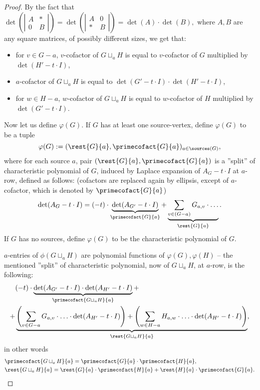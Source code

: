 \begin{proof}
\noindent By the fact that $\det\left(\left|\begin{array}{c|c}
A & \ast\\
\hline
0 & B
\end{array}\right|\right)
=
\det\left(\left|\begin{array}{c|c}
A & 0 \\
\hline
\ast & B
\end{array}\right|\right)
=
\det(A) \cdot \det(B),
$
where $A,B$ are any square matrices, of possibly different sizes,
we get that:
\begin{itemize}
	\item for $v \in G-a$, $v$-cofactor of $G\sqcup_a H$ is equal to $v$-cofactor of $G$ multiplied by $\det(H' - t\cdot I)$, 
	\item $a$-cofactor of $G\sqcup_a H$ is equal to $\det(G' - t\cdot I) \cdot \det(H' - t\cdot I)$,
	\item for $w \in H-a$, $w$-cofactor of $G\sqcup_a H$ is equal to $w$-cofactor of $H$ multiplied by $\det(G' - t\cdot I)$.
\end{itemize}
Now let us define $\varphi(G)$. If $G$ has at least one source-vertex, define $\varphi(G)$ to be a tuple $$\varphi(G):= (\rest{G}{a}, \primecofact{G}{a})_{a \in \sources(G)},$$ where for each source $a$, pair $(\rest{G}{a}, \primecofact{G}{a})$ is a ''split'' of characteristic polynomial of $G$, induced by Laplace expansion of $A_G-t\cdot I$ at $a$-row, defined as follows: (cofactors are replaced again by ellipsis, except of $a$-cofactor, which is denoted by $\primecofact{G}{a}$)
$$
\det(A_G-t\cdot I) = (-t)\cdot \underbrace{\det(A_{G'} - t\cdot I)}_{\primecofact{G}{a}} + \underbrace{\sum_{v \in (G-a)}G_{a,v} \cdot \ldots}_{\rest{G}{a}}.
$$
If $G$ has no sources, define $\varphi(G)$ to be the characteristic polynomial of $G$.

$a$-entries of $\phi(G\sqcup_a H)$ are polynomial functions of $\varphi(G), \varphi(H)$ --
the mentioned ''split'' of characteristic polynomial, now of $G\sqcup_a H$, at $a$-row, is the following:
\begin{align*}
&(-t) \cdot \underbrace{
	\det(A_{G'} - t\cdot I) \cdot \det(A_{H'}-t\cdot I)}_{
	\primecofact{G\sqcup_a H}{a}} +\\
+&\underbrace{\left(\sum_{v\in G-a} G_{a,v} \cdot \ldots \cdot \det(A_{H'} - t\cdot I) \right)
	+
	\left(\sum_{w\in H-a} H_{a,w} \cdot \ldots \cdot \det(A_{H'} - t\cdot I)\right)}_{
	\rest{G\sqcup_a H}{a}},
\end{align*}
in other words
\begin{align*}%
&\primecofact{G\sqcup_a H}{a} = \primecofact{G}{a} \cdot \primecofact{H}{a},\\
&\rest{G\sqcup_a H}{a} = \rest{G}{a} \cdot \primecofact{H}{a} + \rest{H}{a} \cdot \primecofact{G}{a}.
\end{align*}


\end{proof}

